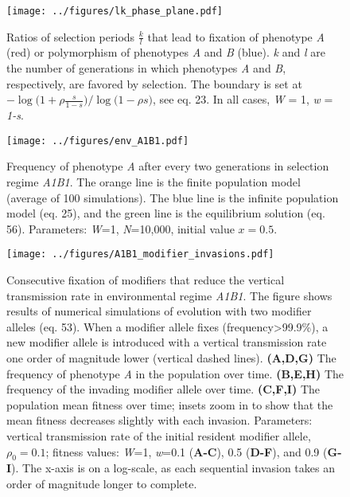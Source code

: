 \documentclass[]{article}
\begin{document}
\begin{figure}
\centering
\texttt{[image: ../figures/lk\_phase\_plane.pdf]}
\caption{Ratios of selection periods \(\frac{k}{l}\) that lead to
fixation of phenotype \emph{A} (red) or polymorphism of phenotypes
\emph{A} and \emph{B} (blue). \emph{k} and \emph{l} are the number of
generations in which phenotypes \emph{A} and \emph{B}, respectively, are favored by selection.
The boundary is set at $-\log{(1+\rho \frac{s}{1-s}}) / \log{(1-\rho s})$, see eq. 23.
In all cases, \emph{W} = 1, \emph{w} = \emph{1-s}.}\label{fig:lk_phase_plane}
\end{figure}

\begin{figure}
\centering
\texttt{[image: ../figures/env\_A1B1.pdf]}
\caption{Frequency of phenotype \emph{A} after every two generations in
selection regime \emph{A1B1}. The orange line is the finite population model
(average of 100 simulations). The blue line is the infinite population model
(eq. 25), and the green line is the equilibrium solution (eq. 56). Parameters: \emph{W}=1,
\emph{N}=10,000, initial value \(x=0.5\).}\label{fig:env_A1B1}
\end{figure}

\begin{figure}
\centering
\texttt{[image: ../figures/A1B1\_modifier\_invasions.pdf]}
\caption{Consecutive fixation of modifiers that reduce the vertical
transmission rate in environmental regime \emph{A1B1}. The figure shows
results of numerical simulations of evolution with two modifier alleles
(eq. 53). When a modifier allele fixes
(frequency\textgreater{}99.9\%), a new modifier allele is introduced
with a vertical transmission rate one order of magnitude lower (vertical
dashed lines). \textbf{(A,D,G)} The frequency of phenotype \emph{A} in
the population over time. \textbf{(B,E,H)} The frequency of the invading
modifier allele over time. \textbf{(C,F,I)} The population mean
fitness over time; insets zoom in to show that the mean fitness 
decreases slightly with each invasion. Parameters: vertical transmission rate of
the initial resident modifier allele, \(\rho_0 =0.1\); fitness values:
\emph{W}=1, \emph{w}=0.1 (\textbf{A-C}), 0.5 (\textbf{D-F}), and 0.9
(\textbf{G-I}). The x-axis is on a log-scale, as each sequential invasion
takes an order of magnitude longer to
complete.}\label{fig:A1B1_modifier_invasions}
\end{figure}
\end{document}
